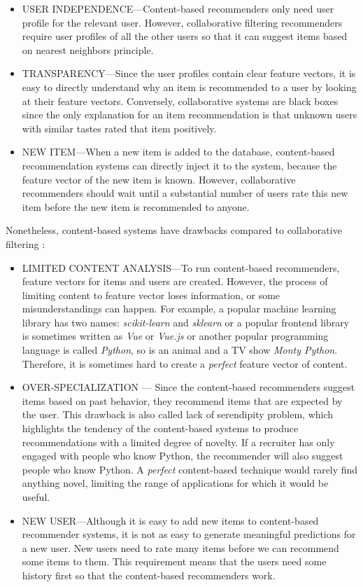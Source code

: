 \begin{itemize}
	\item USER INDEPENDENCE—Content-based recommenders only need user profile for the relevant user. However, collaborative filtering recommenders require user profiles of all the other users so that it can suggest items based on nearest neighbors principle.
	\item TRANSPARENCY—Since the user profiles contain clear feature vectors, it is easy to directly understand why an item is recommended to a user by looking at their feature vectors. Conversely, collaborative systems are black boxes since the only explanation for an item recommendation is that unknown users with similar tastes rated that item positively.
	\item NEW ITEM—When a new item is added to the database, content-based recommendation systems can directly inject it to the system, because the feature vector of the new item is known. However, collaborative recommenders should wait until a substantial number of users rate this new item before the new item is recommended to anyone.
\end{itemize}

Nonetheless, content-based systems have drawbacks compared to collaborative filtering  \cite{de2015semantics}: 

\begin{itemize}
	\item LIMITED CONTENT ANALYSIS—To run content-based recommenders, feature vectors for items and users are created. However, the process of limiting content to feature vector loses information, or some misunderstandings can happen. For example, a popular machine learning library has two names: \textit{scikit-learn} and \textit{sklearn} or a popular frontend library is sometimes written as \textit{Vue} or \textit{Vue.js} or another popular programming language is called \textit{Python}, so is an animal and a TV show \textit{Monty Python}. Therefore, it is sometimes hard to create a \textit{perfect} feature vector of content.
	\item OVER-SPECIALIZATION — Since the content-based recommenders suggest items based on past behavior, they recommend items that are expected by the user. This drawback is also called lack of serendipity problem, which highlights the tendency of the content-based systems to produce recommendations with a limited degree of novelty. If a recruiter has only engaged with people who know Python, the recommender will also suggest people who know Python. A \textit{perfect} content-based technique would rarely find anything novel, limiting the range of applications for which it would be useful.
	\item NEW USER—Although it is easy to add new items to content-based recommender systems, it is not as easy to generate meaningful predictions for a new user. New users need to rate many items before we can recommend some items to them. This requirement means that the users need some history first so that the content-based recommenders work.
\end{itemize}


